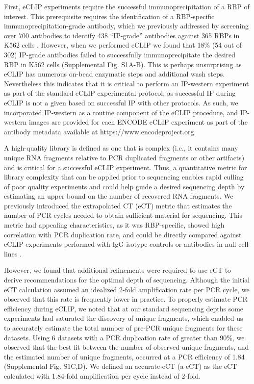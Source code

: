 First, eCLIP experiments require the successful immunoprecipitation of a RBP of interest. This prerequisite requires the identification of a RBP-specific immunoprecipitation-grade antibody, which we previously addressed by screening over 700 antibodies to identify 438 “IP-grade” antibodies against 365 RBPs in K562 cells \cite{Sundararaman2016}. However, when we performed eCLIP we found that 18\% (54 out of 302) IP-grade antibodies failed to successfully immunoprecipitate the desired RBP in K562 cells (Supplemental Fig. S1A-B). This is perhaps unsurprising as eCLIP has numerous on-bead enzymatic steps and additional wash steps. Nevertheless this indicates that it is critical to perform an IP-western experiment as part of the standard eCLIP experimental protocol, as successful IP during eCLIP is not a given based on successful IP with other protocols. As such, we incorporated IP-western as a routine component of the eCLIP procedure, and IP-western images are provided for each ENCODE eCLIP experiment as part of the antibody metadata available at https://www.encodeproject.org.

A high-quality library is defined as one that is complex (i.e., it contains many unique RNA fragments relative to PCR duplicated fragments or other artifacts) and is critical for a successful eCLIP experiment. Thus, a quantitative metric for library complexity that can be applied prior to sequencing enables rapid culling of poor quality experiments and could help guide a desired sequencing depth by estimating an upper bound on the number of recovered RNA fragments. We previously introduced the extrapolated CT (eCT) metric that estimates the number of PCR cycles needed to obtain sufficient material for sequencing. This metric had appealing characteristics, as it was RBP-specific, showed high correlation with PCR duplication rate, and could be directly compared against eCLIP experiments performed with IgG isotype controls or antibodies in null cell lines \cite{VanNostrand2016,VanNostrand2017}.

However, we found that additional refinements were required to use eCT to derive recommendations for the optimal depth of sequencing. Although the initial eCT calculation assumed an idealized 2-fold amplification rate per PCR cycle, we observed that this rate is frequently lower in practice. To properly estimate PCR efficiency during eCLIP, we noted that at our standard sequencing depths some experiments had saturated the discovery of unique fragments, which enabled us to accurately estimate the total number of pre-PCR unique fragments for these datasets. Using 6 datasets with a PCR duplication rate of greater than 90\%, we observed that the best fit between the number of observed unique fragments, and the estimated number of unique fragments, occurred at a PCR efficiency of 1.84 (Supplemental Fig. S1C,D). We defined an accurate-eCT (a-eCT) as the eCT calculated with 1.84-fold amplification per cycle instead of 2-fold.

